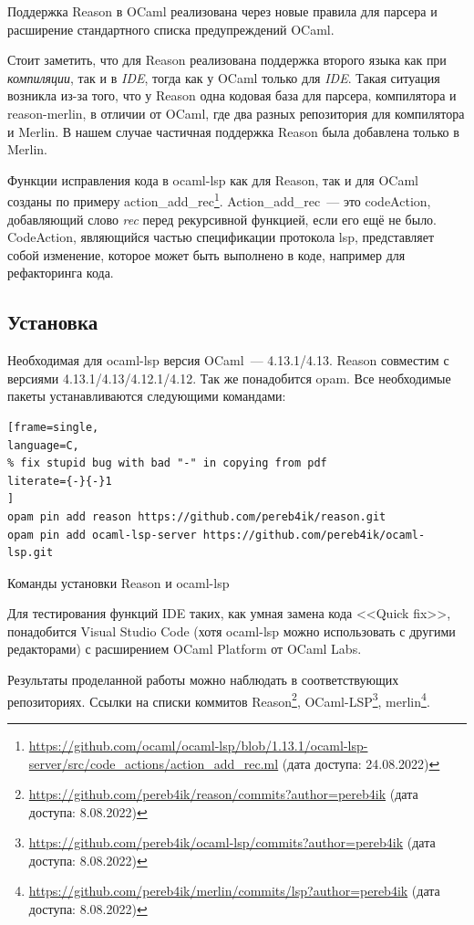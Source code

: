 Поддержка Reason в OCaml реализована через новые правила для парсера и расширение стандартного списка предупреждений OCaml.

Стоит заметить, что для Reason реализована поддержка второго языка как при {\it компиляции}, так и в {\it IDE}, тогда как у OCaml только для {\it IDE}. Такая ситуация возникла из-за того, что у Reason одна кодовая база для парсера, компилятора и reason-merlin, в отличии от OCaml, где два разных репозитория для компилятора и Merlin. В нашем случае частичная поддержка Reason была добавлена только в Merlin.

Функции исправления кода в ocaml-lsp как для Reason, так и для OCaml созданы по примеру action\_add\_rec\footnote{ \url{https://github.com/ocaml/ocaml-lsp/blob/1.13.1/ocaml-lsp-server/src/code_actions/action_add_rec.ml} (дата доступа: 24.08.2022) }. Action\_add\_rec~--- это code\-Action, добавляющий слово {\it rec} перед рекурсивной функцией, если его ещё не было. CodeAction, являющийся частью спецификации протокола lsp, представляет собой изменение, которое может быть выполнено в коде, например для рефакторинга кода.

\subsection{Установка}
Необходимая для ocaml-lsp версия OCaml~--- 4.13.1/4.13. Reason совместим с версиями 4.13.1/4.13/4.12.1/4.12. Так же понадобится opam. Все необходимые пакеты устанавливаются следующими командами:

\lstset{basicstyle=\ttfamily}
\begin{example}
\begin{lstlisting}[frame=single,
language=C,
% fix stupid bug with bad "-" in copying from pdf
literate={-}{-}1
]
opam pin add reason https://github.com/pereb4ik/reason.git
opam pin add ocaml-lsp-server https://github.com/pereb4ik/ocaml-lsp.git
\end{lstlisting}
\caption{Команды установки Reason и ocaml-lsp}
\end{example}
Для тестирования функций IDE таких, как умная замена кода <<Quick fix>>, понадобится Visual Studio Code (хотя ocaml-lsp можно использовать с другими редакторами) с расширением OCaml Platform от OCaml Labs.

Результаты проделанной работы можно наблюдать в соответствующих репозиториях. Ссылки на списки коммитов Reason\footnote{ \url{https://github.com/pereb4ik/reason/commits?author=pereb4ik} (дата доступа: 8.08.2022) },
OCaml-LSP\footnote{ \url{https://github.com/pereb4ik/ocaml-lsp/commits?author=pereb4ik} (дата доступа: 8.08.2022) },
merlin\footnote{ \url{https://github.com/pereb4ik/merlin/commits/lsp?author=pereb4ik} (дата доступа: 8.08.2022) }.